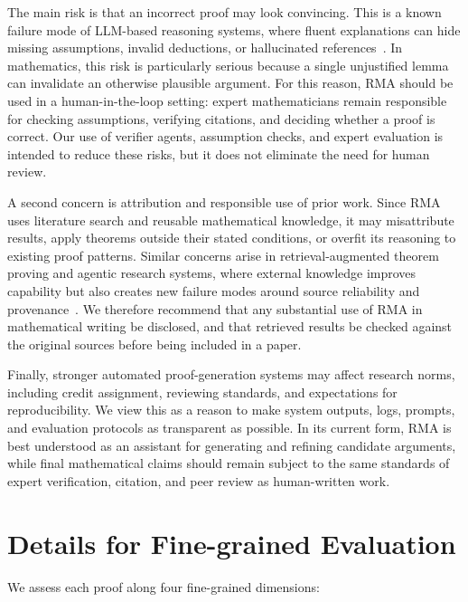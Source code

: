 \documentclass{article}
\newcommand{\modelname}{\textsc{RMA}\xspace}
\begin{document}
The main risk is that an incorrect proof may look convincing. This is a known failure mode of LLM-based reasoning systems, where fluent explanations can hide missing assumptions, invalid deductions, or hallucinated references~\citep{ji2023towards,frieder2024mathematical,collins2024evaluating}. In mathematics, this risk is particularly serious because a single unjustified lemma can invalidate an otherwise plausible argument. For this reason, \modelname should be used in a human-in-the-loop setting: expert mathematicians remain responsible for checking assumptions, verifying citations, and deciding whether a proof is correct. Our use of verifier agents, assumption checks, and expert evaluation is intended to reduce these risks, but it does not eliminate the need for human review.

A second concern is attribution and responsible use of prior work. Since \modelname uses literature search and reusable mathematical knowledge, it may misattribute results, apply theorems outside their stated conditions, or overfit its reasoning to existing proof patterns. Similar concerns arise in retrieval-augmented theorem proving and agentic research systems, where external knowledge improves capability but also creates new failure modes around source reliability and provenance~\citep{yang2023leandojo,karpathy_autoresearch,zimmer2026agenticresearcherpracticalguide}. We therefore recommend that any substantial use of \modelname in mathematical writing be disclosed, and that retrieved results be checked against the original sources before being included in a paper.

Finally, stronger automated proof-generation systems may affect research norms, including credit assignment, reviewing standards, and expectations for reproducibility. We view this as a reason to make system outputs, logs, prompts, and evaluation protocols as transparent as possible. In its current form, \modelname is best understood as an assistant for generating and refining candidate arguments, while final mathematical claims should remain subject to the same standards of expert verification, citation, and peer review as human-written work.

\section{Details for Fine-grained Evaluation}
\label{app-fine-grained}
We assess each proof along four fine-grained dimensions:
\end{document}

